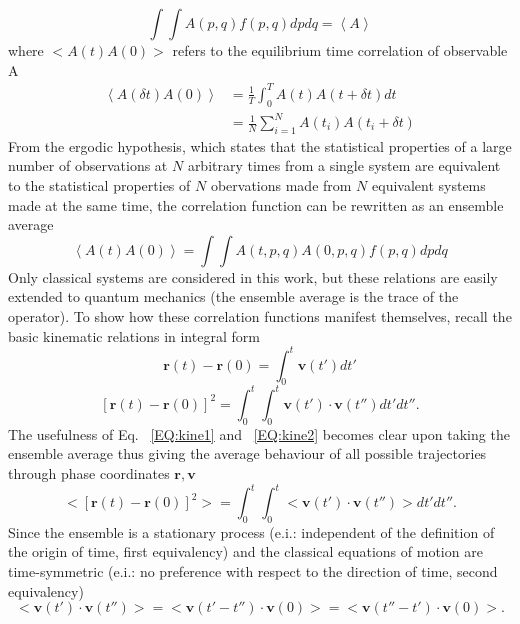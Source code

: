 \begin{equation}
\int \int A(p,q) f(p,q) dpdq=\left<A\right>
\end{equation}
where $<A(t)A(0)>$ refers to the equilibrium time correlation of observable A
\begin{equation}
\begin{split}
\left<A(\delta t)A(0)\right>&=\frac{1}{T}\int_0^TA(t)A(t+\delta t)dt\\
&=\frac{1}{N}\sum_{i=1}^NA(t_i)A(t_i+\delta t)
\end{split}
\end{equation}
From the ergodic hypothesis, which states that the statistical properties of a large number of observations at $N$ arbitrary times from a single system are equivalent to the statistical properties of $N$ obervations made from $N$ equivalent systems made at the same time, the correlation function can be rewritten as an ensemble average \cite{mcquarrie}
\begin{equation}
\left<A( t)A(0)\right>=\int \int A(t,p,q)A(0,p,q) f(p,q) dpdq 
\end{equation}
Only classical systems are considered in this work, but these relations are easily extended to quantum mechanics (the ensemble average is the trace of the operator). To show how these correlation functions manifest themselves, recall the basic kinematic relations in integral form
%
\begin{equation} \label{EQ:kine1}
\bm{r}(t)-\bm{r}(0)=\int_0^t \bm{v}(t')dt'
\end{equation}
\begin{equation} \label{EQ:kine2}
[\bm{r}(t)-\bm{r}(0)]^2=\int_0^t \int_0^t \bm{v}(t')\cdot\bm{v}(t'')dt'dt''.
\end{equation}
%
The usefulness of Eq. ~\ref {EQ:kine1} and ~\ref{EQ:kine2} becomes clear upon taking the ensemble average thus giving the average behaviour of all possible trajectories through phase coordinates $\bm{r},\bm{v}$
%
\begin{equation}
<[\bm{r}(t)-\bm{r}(0)]^2>=\int_0^t \int_0^t <\bm{v}(t')\cdot\bm{v}(t'')>dt'dt''.
\end{equation}
%
Since the ensemble is a stationary process (e.i.: independent of the definition of the origin of time, first equivalency) and the classical equations of motion are time-symmetric (e.i.: no preference with respect to the direction of time, second equivalency)
%
\begin{equation}
<\bm{v}(t')\cdot\bm{v}(t'')>=<\bm{v}(t'-t'')\cdot\bm{v}(0)>=<\bm{v}(t''-t')\cdot\bm{v}(0)>.
\end{equation}
